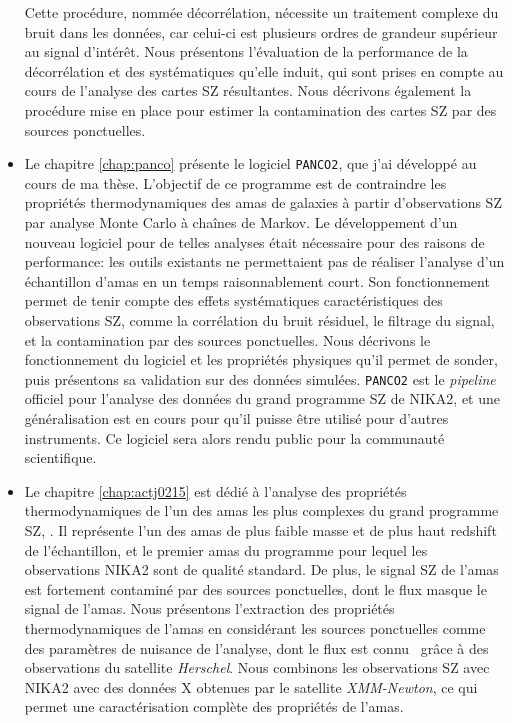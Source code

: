 \begin{itemize}[leftmargin=*]
    Cette procédure, nommée décorrélation, nécessite un traitement complexe du bruit dans les données, car celui-ci est plusieurs ordres de grandeur supérieur au signal d'intérêt.
    Nous présentons l'évaluation de la performance de la décorrélation et des systématiques qu'elle induit, qui sont prises en compte au cours de l'analyse des cartes SZ résultantes.
    Nous décrivons également la procédure mise en place pour estimer la contamination des cartes SZ par des sources ponctuelles.
\item
    Le chapitre \ref{chap:panco} présente le logiciel \texttt{PANCO2}, que j'ai développé au cours de ma thèse.
    L'objectif de ce programme est de contraindre les propriétés thermodynamiques des amas de galaxies à partir d'observations SZ par analyse Monte Carlo à chaînes de Markov.
    Le développement d'un nouveau logiciel pour de telles analyses était nécessaire pour des raisons de performance: les outils existants ne permettaient pas de réaliser l'analyse d'un échantillon d'amas en un temps raisonnablement court.
    Son fonctionnement permet de tenir compte des effets systématiques caractéristiques des observations SZ, comme la corrélation du bruit résiduel, le filtrage du signal, et la contamination par des sources ponctuelles.
    Nous décrivons le fonctionnement du logiciel et les propriétés physiques qu'il permet de sonder, puis présentons sa validation sur des données simulées.
    \texttt{PANCO2} est le \textit{pipeline} officiel pour l'analyse des données du grand programme SZ de NIKA2, et une généralisation est en cours pour qu'il puisse être utilisé pour d'autres instruments.
    Ce logiciel sera alors rendu public pour la communauté scientifique.
\item
    Le chapitre \ref{chap:actj0215} est dédié à l'analyse des propriétés thermodynamiques de l'un des amas les plus complexes du grand programme SZ, \act.
    Il représente l'un des amas de plus faible masse et de plus haut redshift de l'échantillon, et le premier amas du programme pour lequel les observations NIKA2 sont de qualité standard.
    De plus, le signal SZ de l'amas est fortement contaminé par des sources ponctuelles, dont le flux masque le signal de l'amas.
    Nous présentons l'extraction des propriétés thermodynamiques de l'amas en considérant les sources ponctuelles comme des paramètres de nuisance de l'analyse, dont le flux est connu \prior\ grâce à des observations du satellite \textit{Herschel}.
    Nous combinons les observations SZ avec NIKA2 avec des données X obtenues par le satellite \textit{XMM-Newton}, ce qui permet une caractérisation complète des propriétés de l'amas.

\end{itemize}
